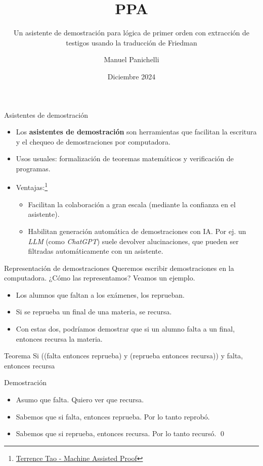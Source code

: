 \documentclass{beamer}
\title{PPA}
\subtitle{Un asistente de demostración para
lógica de primer orden con extracción de
testigos usando la traducción de Friedman}
\author{Manuel Panichelli}
\institute{Deparatamento de Computación, FCEyN, UBA}
\date{Diciembre 2024}
\begin{document}
\frame{\titlepage}

\begin{frame}{Asistentes de demostración}
    \begin{itemize}
        \item Los \textbf{asistentes de demostración} son herramientas que facilitan la escritura y el chequeo de demostraciones por computadora.
        \item Usos usuales: formalización de teoremas matemáticos y verificación de programas.
        \item Ventajas:\footnote{\href{https://youtu.be/AayZuuDDKP0?si=eGETzgh9PQ_8JecR}{Terrence Tao - Machine Assisted Proof}}
        \begin{itemize}
            \item Facilitan la colaboración a gran escala (mediante la confianza en el asistente).
            \item Habilitan generación automática de demostraciones con IA. Por ej. un \textit{LLM} (como \textit{ChatGPT}) suele devolver alucinaciones, que pueden ser filtradas automáticamente con un asistente.
        \end{itemize}
    \end{itemize}
\end{frame}

\begin{frame}{Representación de demostraciones}
    Queremos escribir demostraciones en la computadora. ¿Cómo las representamos? Veamos un ejemplo.
    
    \begin{itemize}
        \item Los alumnos que faltan a los exámenes, los reprueban.
        \item Si se reprueba un final de una materia, se recursa.
        \item Con estas dos, podríamos demostrar que si un alumno falta a un final, entonces recursa la materia.
    \end{itemize}

    \begin{block}{Teorema}
        Si ((falta entonces reprueba) y (reprueba entonces recursa)) y falta, entonces recursa
    \end{block}
    \begin{exampleblock}{Demostración}
        \begin{itemize}
    \item Asumo que falta. Quiero ver que recursa.
    \item Sabemos que si falta, entonces reprueba. Por lo tanto reprobó.
    \item Sabemos que si reprueba, entonces recursa. Por lo tanto recursó. \qed
\end{itemize}
    \end{exampleblock}
\end{frame}
\end{document}
